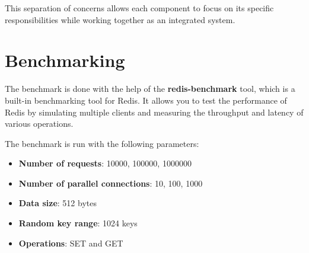 \documentclass{article}
\begin{document}
This separation of concerns allows each component to focus on its specific responsibilities while working together as an integrated system.

\section{Benchmarking}

The benchmark is done with the help of the \textbf{redis-benchmark} tool, which is a built-in benchmarking tool for Redis. It allows you to test the performance of Redis by simulating multiple clients and measuring the throughput and latency of various operations.

\noindent The benchmark is run with the following parameters:
\begin{itemize}
    \item \textbf{Number of requests}: 10000, 100000, 1000000
    \item \textbf{Number of parallel connections}: 10, 100, 1000
    \item \textbf{Data size}: 512 bytes
    \item \textbf{Random key range}: 1024 keys
    \item \textbf{Operations}: SET and GET
\end{itemize}
\end{document}
